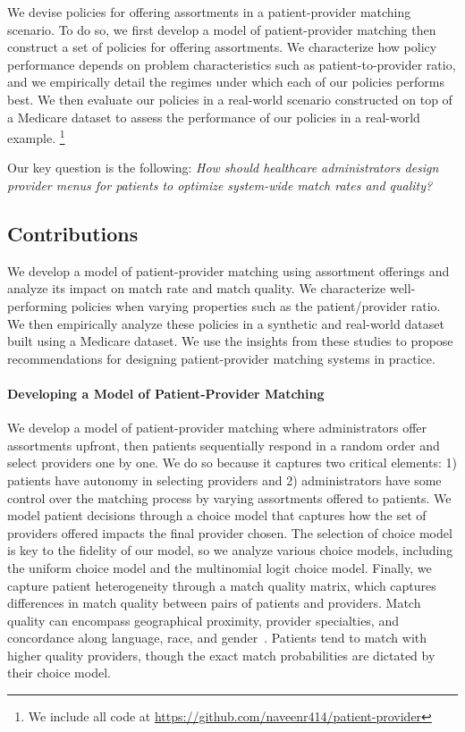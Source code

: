 We devise policies for offering assortments in a patient-provider matching scenario. 
To do so, we first develop a model of patient-provider matching then construct a set of policies for offering assortments. 
We characterize how policy performance depends on problem characteristics such as patient-to-provider ratio, and we empirically detail the regimes under which each of our policies performs best.  
We then evaluate our policies in a real-world scenario constructed on top of a Medicare dataset to assess the performance of our policies in a real-world example. 
\footnote{We include all code at \url{https://github.com/naveenr414/patient-provider}}

Our key question is the following: \textit{How should healthcare administrators design provider menus for patients to optimize system-wide match rates and quality?}

\subsection{Contributions}
We develop a model of patient-provider matching using assortment offerings and analyze its impact on match rate and match quality. 
We characterize well-performing policies when varying properties such as the patient/provider ratio.
We then empirically analyze these policies in a synthetic and real-world dataset built using a Medicare dataset. 
We use the insights from these studies to propose recommendations for designing patient-provider matching systems in practice. 

\paragraph{Developing a Model of Patient-Provider Matching}
We develop a model of patient-provider matching where administrators offer assortments upfront, then patients sequentially respond in a random order and select providers one by one. 
We do so because it captures two critical elements: 1) patients have autonomy in selecting providers and 2) administrators have some control over the matching process by varying assortments offered to patients. 
We model patient decisions through a choice model that captures how the set of providers offered impacts the final provider chosen. 
The selection of choice model is key to the fidelity of our model, so we analyze various choice models, including the uniform choice model and the multinomial logit choice model.
Finally, we capture patient heterogeneity through a match quality matrix, which captures differences in match quality between pairs of patients and providers. 
Match quality can encompass geographical proximity, provider specialties, and concordance along language, race, and gender~\citep{race_concordance,gender_concordance,language_concordance}. 
Patients tend to match with higher quality providers, though the exact match probabilities are dictated by their choice model. 

